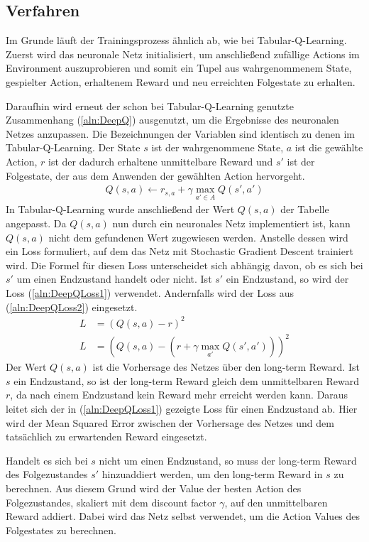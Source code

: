 \documentclass[11pt]{scrartcl}
\begin{document}
\subsection{Verfahren}
\label{sec:deepq-procedure}
Im Grunde läuft der Trainingsprozess ähnlich ab, wie bei Tabular-Q-Learning. Zuerst wird
das neuronale Netz initialisiert, um anschließend zufällige Actions im Environment
auszuprobieren und somit ein Tupel aus wahrgenommenem State, gespielter Action, erhaltenem Reward
und neu erreichten Folgestate zu erhalten.

Daraufhin wird erneut der schon bei Tabular-Q-Learning genutzte Zusammenhang
(\ref{aln:DeepQ}) ausgenutzt, um die Ergebnisse des neuronalen Netzes anzupassen.
Die Bezeichnungen der Variablen sind identisch zu denen im Tabular-Q-Learning. Der State
$s$ ist der wahrgenommene State, $a$ ist die gewählte Action, $r$ ist der dadurch
erhaltene unmittelbare Reward und $s'$ ist der Folgestate, der aus dem Anwenden der
gewählten Action hervorgeht.
\begin{align}
  Q(s, a) \leftarrow r_{s,a} + \gamma \max_{a' \in A}Q(s', a') \label{aln:DeepQ}
\end{align}
\noindent
In Tabular-Q-Learning wurde anschließend der Wert $Q(s, a)$ der Tabelle angepasst. Da 
$Q(s, a)$ nun durch ein neuronales Netz implementiert ist, kann $Q(s, a)$ nicht dem
gefundenen Wert zugewiesen werden. Anstelle dessen wird ein Loss formuliert, auf dem
das Netz mit Stochastic Gradient Descent trainiert wird. Die Formel für diesen Loss
unterscheidet sich abhängig davon, ob es sich bei $s'$ um einen Endzustand handelt oder
nicht. Ist $s'$ ein Endzustand, so wird der Loss (\ref{aln:DeepQLoss1}) verwendet.
Andernfalls wird der Loss aus (\ref{aln:DeepQLoss2}) eingesetzt.
\begin{align}
  L & = \left(Q(s, a) - r\right)^2 \label{aln:DeepQLoss1} \\
  L & = \left(Q(s, a) - \left(r + \gamma \max_{a'} Q(s', a')\right)\right)^2 \label{aln:DeepQLoss2}
\end{align}
\noindent
Der Wert $Q(s, a)$ ist die Vorhersage des Netzes über den long-term Reward. Ist $s$ ein
Endzustand, so ist der long-term Reward gleich dem unmittelbaren Reward $r$, da nach einem
Endzustand kein Reward mehr erreicht werden kann. Daraus leitet sich der in
(\ref{aln:DeepQLoss1}) gezeigte Loss für einen Endzustand ab. Hier wird der Mean Squared
Error zwischen der Vorhersage des Netzes und dem tatsächlich zu erwartenden Reward
eingesetzt.

Handelt es sich bei $s$ nicht um einen Endzustand, so muss der long-term Reward des
Folgezustandes $s'$ hinzuaddiert werden, um den long-term Reward in $s$ zu berechnen. Aus
diesem Grund wird der Value der besten Action des Folgezustandes, skaliert mit dem
discount factor $\gamma$, auf den unmittelbaren Reward addiert. Dabei wird das Netz selbst
verwendet, um die Action Values des Folgestates zu berechnen.
\end{document}
